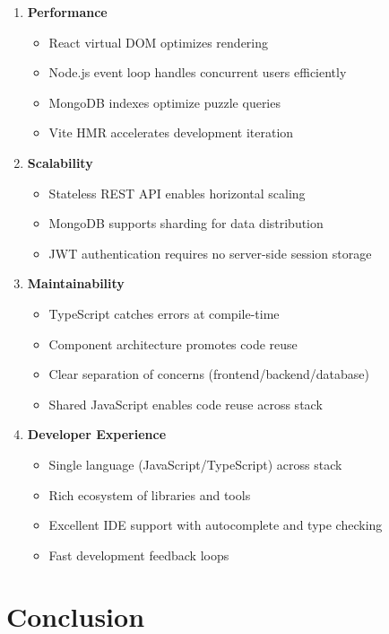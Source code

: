 \begin{enumerate}
    \item \textbf{Performance}
    \begin{itemize}
        \item React virtual DOM optimizes rendering
        \item Node.js event loop handles concurrent users efficiently
        \item MongoDB indexes optimize puzzle queries
        \item Vite HMR accelerates development iteration
    \end{itemize}
    
    \item \textbf{Scalability}
    \begin{itemize}
        \item Stateless REST API enables horizontal scaling
        \item MongoDB supports sharding for data distribution
        \item JWT authentication requires no server-side session storage
    \end{itemize}
    
    \item \textbf{Maintainability}
    \begin{itemize}
        \item TypeScript catches errors at compile-time
        \item Component architecture promotes code reuse
        \item Clear separation of concerns (frontend/backend/database)
        \item Shared JavaScript enables code reuse across stack
    \end{itemize}
    
    \item \textbf{Developer Experience}
    \begin{itemize}
        \item Single language (JavaScript/TypeScript) across stack
        \item Rich ecosystem of libraries and tools
        \item Excellent IDE support with autocomplete and type checking
        \item Fast development feedback loops
    \end{itemize}
\end{enumerate}

\section*{Conclusion}

